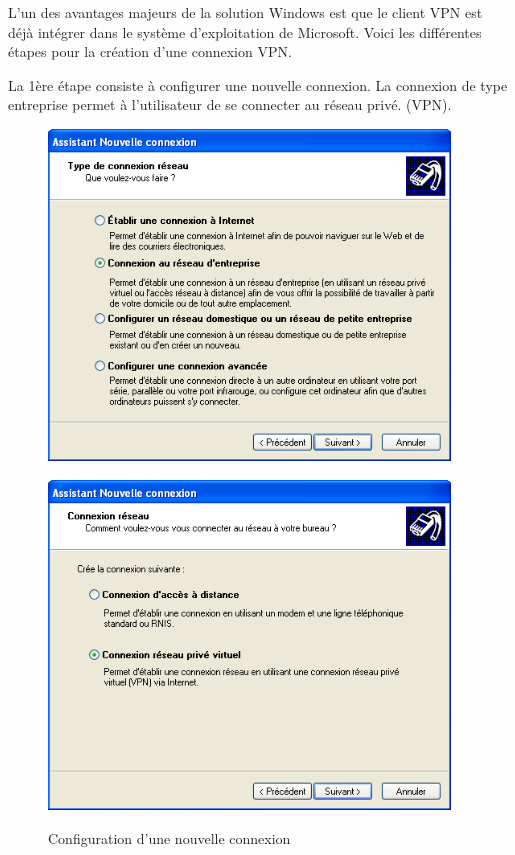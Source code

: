 L'un des avantages majeurs de la solution Windows est que le client VPN est déjà intégrer dans le système d'exploitation de Microsoft. Voici les différentes étapes pour la création d'une connexion VPN.

La 1ère étape consiste à configurer une nouvelle connexion. La connexion de type entreprise permet à l'utilisateur de se connecter au réseau privé. (VPN).

\begin{figure}[H]
	\begin{minipage}{0.5\textwidth}
		\begin{flushleft} \large
			\includegraphics[width=0.95\textwidth]{partie_2/screen_windows/etape1.PNG}\\
		\end{flushleft}
	\end{minipage}
	\begin{minipage}{0.5\textwidth}
		\begin{flushright} \large
			\includegraphics[width=0.95\textwidth]{partie_2/screen_windows/etape2.PNG}\\
		\end{flushright}
	\end{minipage}
	\caption{Configuration d'une nouvelle connexion}
	\label{VPN_ETAPE1}
\end{figure}
~\

